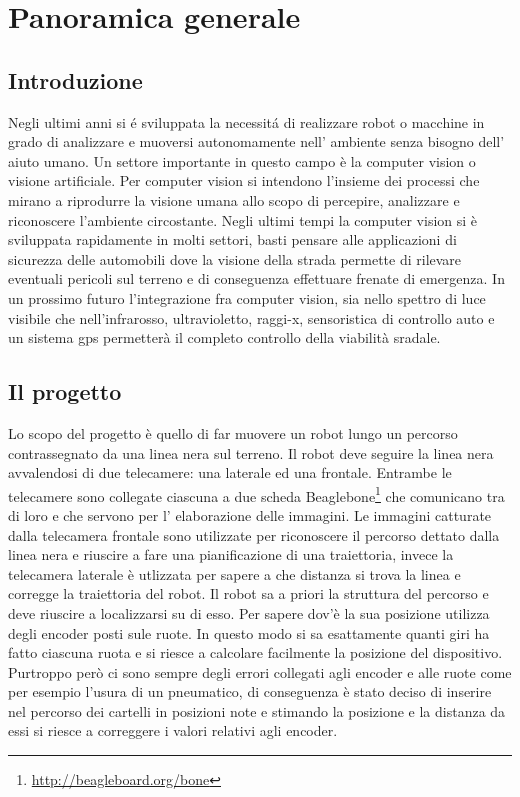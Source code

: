 \chapter{Panoramica generale}

\section{Introduzione}

	Negli ultimi anni si \'e sviluppata la necessit\'a di realizzare robot o macchine in grado di analizzare e muoversi autonomamente nell' ambiente senza bisogno dell' aiuto umano. Un settore importante in questo campo è la computer vision o visione artificiale. Per computer vision si intendono l’insieme dei processi che mirano a riprodurre la visione umana allo scopo di percepire, analizzare e riconoscere l'ambiente circostante. Negli ultimi tempi la computer vision si è sviluppata rapidamente in molti settori, basti pensare alle applicazioni di sicurezza delle automobili dove la visione della strada permette di rilevare eventuali pericoli sul terreno e di conseguenza effettuare frenate di emergenza. In un prossimo futuro l'integrazione fra computer vision, sia nello spettro di luce visibile che nell'infrarosso, ultravioletto, raggi-x, sensoristica di controllo auto e un sistema gps permetterà il completo controllo della viabilità sradale.

\section{Il progetto}

	Lo scopo del progetto è quello di far muovere un robot lungo un percorso contrassegnato da una linea nera sul terreno. Il robot deve seguire la linea nera avvalendosi di due telecamere: una laterale ed una frontale. Entrambe le telecamere sono collegate ciascuna a due scheda Beaglebone\footnote{\url{http://beagleboard.org/bone}} che comunicano tra di loro e che servono per l' elaborazione delle immagini. Le immagini catturate dalla telecamera frontale sono utilizzate per riconoscere il percorso dettato dalla linea nera e riuscire a fare una pianificazione di una traiettoria, invece la telecamera laterale è utlizzata per sapere a che distanza si trova la linea e corregge la traiettoria del robot. Il robot sa a priori la struttura del percorso e deve riuscire a localizzarsi su di esso. Per sapere dov'è la sua posizione utilizza degli encoder posti sule ruote. In questo modo si sa esattamente quanti giri ha fatto ciascuna ruota e si riesce a calcolare facilmente la posizione del dispositivo. Purtroppo però ci sono sempre degli errori collegati agli encoder e alle ruote come per esempio l'usura di un pneumatico, di conseguenza è stato deciso di inserire nel percorso dei cartelli in posizioni note e stimando la posizione e la distanza da essi si riesce a correggere i valori relativi agli encoder.

